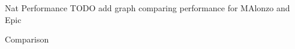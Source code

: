 \begin{frame}{Nat Performance}
TODO add graph comparing performance for MAlonzo and Epic
\end{frame}


\begin{frame}{Comparison}
\end{frame}
